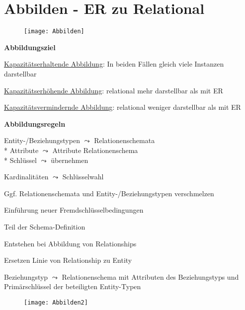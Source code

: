 \section{Abbilden - ER zu Relational}
\label{sec:abbilden}

\begin{figure}[H]\centering\label{Abbilden}\texttt{[image: Abbilden]}\end{figure}

\textbf{Abbildungsziel}
\begin{items}
	\item \underline{Kapazitätserhaltende Abbildung}: In beiden Fällen gleich viele Instanzen darstellbar
	\item \underline{Kapazitätserhöhende Abbildung}: relational mehr darstellbar als mit ER
	\item \underline{Kapazitätsvermindernde Abbildung}: relational weniger darstellbar als mit ER
\end{items}

\textbf{Abbildungsregeln}
\begin{items}
	\item Entity-/Beziehungstypen \( \leadsto \) Relationenschemata \\* Attribute \( \leadsto \) Attribute Relationenschema \\* Schlüssel \( \leadsto \) übernehmen
	\item Kardinalitäten \( \leadsto \) Schlüsselwahl
	\item Ggf. Relationenschemata und Entity-/Beziehungstypen verschmelzen
	\item Einführung neuer Fremdschlüsselbedingungen
	\begin{enumeration}
		\item Teil der Schema-Definition
		\item Entstehen bei Abbildung von Relationships
		\item Ersetzen Linie von Relationship zu Entity
	\end{enumeration}
	\item Beziehungstyp \( \leadsto \) Relationenschema mit Attributen des Beziehungstyps und Primärschlüssel der beteiligten Entity-Typen
\end{items}
\begin{figure}[H]\centering\label{Abbilden2}\texttt{[image: Abbilden2]}\end{figure}

